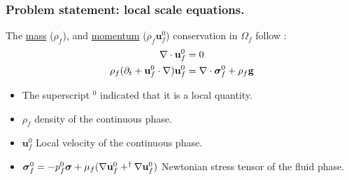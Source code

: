 \documentclass{sintefbeamer}
\begin{document}


\begin{frame}
  \frametitle{Problem statement: local scale equations.}
  The \underline{mass} ($\rho_f$), and \underline{momentum} ($\rho_f \textbf{u}_f^0$) conservation in $\Omega_f$ follow :
\begin{align}
  \mathbf{\nabla}\cdot  \textbf{u}_f^0
  &= 
  0
  \\
  \rho_f (\partial_t  + \textbf{u}_f^0 \cdot \mathbf{\nabla})
  \textbf{u}_f^0  
  &= 
  \mathbf{\nabla}\cdot  \bm{\sigma}_f^0 
  + \rho_f \textbf{g}
\end{align}
\begin{itemize}
    \item The superscript $^0$ indicated that it is a local quantity.
    \item $\rho_f$  density of the continuous phase. 
    \item $\textbf{u}_f^0$ Local velocity of the continuous phase.
    \item $\bm\sigma_f^0 = -p_f^0 \bm\sigma + \mu_f (\mathbf{\nabla} \textbf{u}_f^0+^\dagger\mathbf{\nabla} \textbf{u}_f^0)$ Newtonian stress tensor of the fluid phase. 
\end{itemize}

\end{frame}
\end{document}
